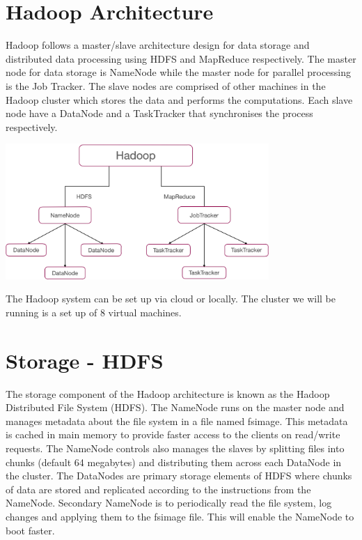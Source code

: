 \documentclass[11pt]{book}
\begin{document}

\section{Hadoop Architecture}

Hadoop follows a master/slave architecture design for data storage and distributed data processing using HDFS and MapReduce respectively. The master node for data storage is NameNode while the master node for parallel processing is the Job Tracker. The slave nodes are comprised of other machines in the Hadoop cluster which stores the data and performs the computations. Each slave node have a DataNode and a TaskTracker that synchronises the process respectively. \\

\begin{center}
 \includegraphics[width=10cm]{hadoop}\\
 \end{center}

The Hadoop system can be set up via cloud or locally. The cluster we will be running is a set up of 8 virtual machines.

\section{Storage - HDFS}

The storage component of the Hadoop architecture is known as the Hadoop Distributed File System (HDFS). The NameNode runs on the master node and manages metadata about the file system in a file named fsimage. This metadata is cached in main memory to provide faster access to the clients on read/write requests. The NameNode controls also manages the slaves by splitting files into chunks (default 64 megabytes) and distributing them across each DataNode in the cluster. The DataNodes are primary storage elements of HDFS where chunks of data are stored and replicated according to the instructions from the NameNode. Secondary NameNode is to periodically read the file system, log changes and applying them to the fsimage file. This will enable the NameNode to boot faster.\\
\end{document}
